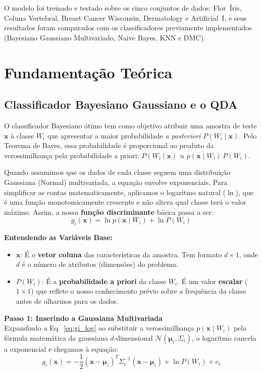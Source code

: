 \documentclass[12pt, a4paper]{article}
\begin{document}
O modelo foi treinado e testado sobre os cinco conjuntos de dados:
Flor~Íris, Coluna Vertebral, Breast Cancer Wisconsin, Dermatology e
Artificial~I, e seus resultados foram comparados com os
classificadores previamente implementados (Bayesiano Gaussiano
Multivariado, Naive Bayes, KNN e DMC).

\section{Fundamentação Teórica}

\subsection{Classificador Bayesiano Gaussiano e o QDA}
O classificador Bayesiano ótimo tem como objetivo atribuir uma amostra de teste $\mathbf{x}$ à classe $W_i$ que apresentar a maior probabilidade \textit{a posteriori} $P(W_i \mid \mathbf{x})$. Pelo Teorema de Bayes, essa probabilidade é proporcional ao produto da verossimilhança pela probabilidade a priori: $P(W_i \mid \mathbf{x}) \propto p(\mathbf{x} \mid W_i)\,P(W_i)$. 

Quando assumimos que os dados de cada classe seguem uma distribuição Gaussiana (Normal) multivariada, a equação envolve exponenciais. Para simplificar as contas matematicamente, aplicamos o logaritmo natural ($\ln$), que é uma função monotomicamente crescente e não altera qual classe terá o valor máximo. Assim, a nossa \textbf{função discriminante} básica passa a ser:
\begin{equation}
    g_i(\mathbf{x}) = \ln p(\mathbf{x} \mid W_i) + \ln P(W_i) \label{eq:gi_log}
\end{equation}

\noindent \textbf{Entendendo as Variáveis Base:}
\begin{itemize}
    \item $\mathbf{x}$: É o \textbf{vetor coluna} das características da amostra. Tem formato $d \times 1$, onde $d$ é o número de atributos (dimensões) do problema.
    \item $P(W_i)$: É a \textbf{probabilidade a priori} da classe $W_i$. É um valor \textbf{escalar} ($1 \times 1$) que reflete o nosso conhecimento prévio sobre a frequência da classe antes de olharmos para os dados.
\end{itemize}

\vspace{0.3cm}
\noindent \textbf{Passo 1: Inserindo a Gaussiana Multivariada} \\
Expandindo a Eq.~\eqref{eq:gi_log} ao substituir a verossimilhança $p(\mathbf{x} \mid W_i)$ pela fórmula matemática da gaussiana $d$-dimensional $\mathcal{N}(\boldsymbol{\mu}_i, \Sigma_i)$, o logaritmo cancela a exponencial e chegamos à equação:
\begin{equation}
    g_i(\mathbf{x}) = -\frac{1}{2}(\mathbf{x}-\boldsymbol{\mu}_i)^T \Sigma_i^{-1}(\mathbf{x}-\boldsymbol{\mu}_i) + \ln P(W_i) + c_i \label{eq:gi_quadratico}
\end{equation}
\end{document}
